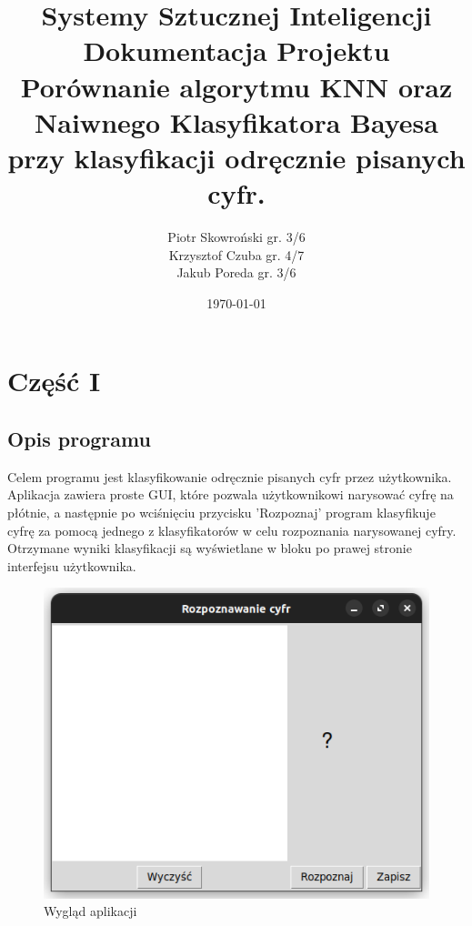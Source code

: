 \documentclass[12pt,a4paper]{article}
\begin{document}
	\title{Systemy Sztucznej Inteligencji\\\small
    {Dokumentacja Projektu\\Porównanie algorytmu KNN oraz 
        Naiwnego Klasyfikatora Bayesa przy klasyfikacji odręcznie pisanych cyfr.}}
    \author{Piotr Skowroński gr. 3/6\\Krzysztof Czuba gr. 4/7\\Jakub Poreda gr. 3/6}
	\date{\today}

	\maketitle
	\newpage
	\section*{Część I}
	\subsection*{Opis programu}
    Celem programu jest klasyfikowanie odręcznie pisanych cyfr przez użytkownika. Aplikacja zawiera proste GUI,
    które pozwala użytkownikowi narysować cyfrę na płótnie, a następnie po wciśnięciu przycisku 'Rozpoznaj' program
    klasyfikuje cyfrę za pomocą jednego z klasyfikatorów w celu rozpoznania narysowanej cyfry. Otrzymane wyniki 
	klasyfikacji są wyświetlane w bloku po prawej stronie interfejsu użytkownika.
	\begin{figure}[!h]
		\includegraphics{"app1.png"}
		\centering
		\caption{Wygląd aplikacji}
	\end{figure}
\end{document}

